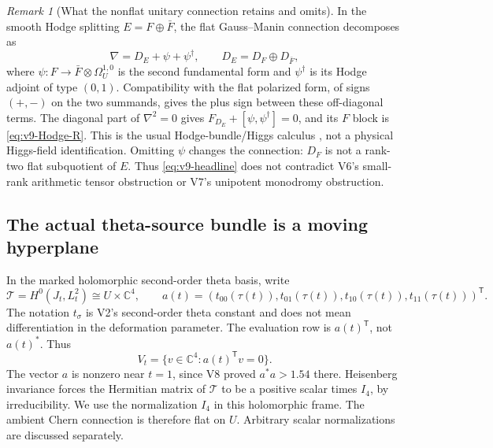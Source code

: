 \documentclass[11pt]{article}
\theoremstyle{definition}
\theoremstyle{remark}
\newtheorem{remark}[remark]{Remark}
\newcommand{\C}{\mathbb C}
\begin{document}
\begin{remark}[What the nonflat unitary connection retains and omits]
In the smooth Hodge splitting $E=F\oplus\bar F$, the flat Gauss--Manin
connection decomposes as
\[
 \nabla=D_E+\psi+\psi^{\dagger},\qquad D_E=D_F\oplus D_{\bar F},
\]
where $\psi:F\to\bar F\otimes\Omega_U^{1,0}$ is the second fundamental
form and $\psi^{\dagger}$ is its Hodge adjoint of type $(0,1)$.
Compatibility with the flat polarized form, of signs $(+,-)$ on the two
summands, gives the plus sign between these off-diagonal terms. The diagonal
part of $\nabla^2=0$ gives $F_{D_E}+[\psi,\psi^\dagger]=0$, and its
$F$ block is \cref{eq:v9-Hodge-R}. This is the usual Hodge-bundle/Higgs
calculus \cite{GreenGriffiths,SimpsonHiggs}, not a physical Higgs-field
identification. Omitting $\psi$ changes the connection: $D_F$ is not a
rank-two flat subquotient of $E$. Thus \cref{eq:v9-headline} does not
contradict V6's small-rank arithmetic tensor obstruction or V7's unipotent
monodromy obstruction.
\end{remark}

\subsection{The actual theta-source bundle is a moving hyperplane}
In the marked holomorphic second-order theta basis, write
\[
 \mathcal T=H^0(J_t,L_t^2)\cong U\times\C^4,
 \qquad
 a(t)=(t_{00}(\tau(t)),t_{01}(\tau(t)),t_{10}(\tau(t)),t_{11}(\tau(t)))^{\mathsf T}.
\]
The notation $t_{\sigma}$ is V2's second-order theta constant and does not
mean differentiation in the deformation parameter. The evaluation row is
$a(t)^{\mathsf T}$, not $a(t)^*$. Thus
\begin{equation}
 \boxed{V_t=\{v\in\C^4:a(t)^{\mathsf T}v=0\}.}
 \label{eq:v9-hyperplane}
\end{equation}
The vector $a$ is nonzero near $t=1$, since V8 proved $a^*a>1.54$ there.
Heisenberg invariance forces the Hermitian matrix of $\mathcal T$ to be a
positive scalar times $I_4$, by irreducibility. We use the normalization
$I_4$ in this holomorphic frame. The ambient Chern connection is therefore
flat on $U$. Arbitrary scalar normalizations are discussed separately.
\end{document}
